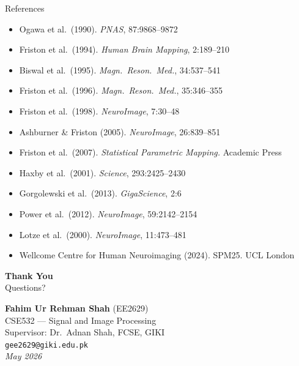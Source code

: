 \documentclass[aspectratio=169]{beamer}
\begin{document}
\begin{frame}{References}
  \footnotesize
  \begin{itemize}
    \item Ogawa et al.\ (1990). \textit{PNAS}, 87:9868--9872
    \item Friston et al.\ (1994). \textit{Human Brain Mapping}, 2:189--210
    \item Biswal et al.\ (1995). \textit{Magn.\ Reson.\ Med.}, 34:537--541
    \item Friston et al.\ (1996). \textit{Magn.\ Reson.\ Med.}, 35:346--355
    \item Friston et al.\ (1998). \textit{NeuroImage}, 7:30--48
    \item Ashburner \& Friston (2005). \textit{NeuroImage}, 26:839--851
    \item Friston et al.\ (2007). \textit{Statistical Parametric Mapping.} Academic Press
    \item Haxby et al.\ (2001). \textit{Science}, 293:2425--2430
    \item Gorgolewski et al.\ (2013). \textit{GigaScience}, 2:6
    \item Power et al.\ (2012). \textit{NeuroImage}, 59:2142--2154
    \item Lotze et al.\ (2000). \textit{NeuroImage}, 11:473--481
    \item Wellcome Centre for Human Neuroimaging (2024). SPM25. UCL London
  \end{itemize}
\end{frame}

\begin{frame}{}
  \centering
  \vspace{1em}
  \Huge\textbf{Thank You}\\[0.8em]
  \Large Questions?
  \vspace{1.2em}

  \normalsize
  \textbf{Fahim Ur Rehman Shah} (EE2629)\\[0.2em]
  CSE532 --- Signal and Image Processing\\[0.2em]
  Supervisor: Dr.\ Adnan Shah, FCSE, GIKI\\[0.2em]
  \texttt{gee2629@giki.edu.pk}\\[0.5em]
  \textit{May 2026}
\end{frame}
\end{document}
